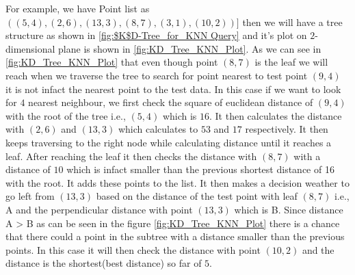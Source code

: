 \begin{mscexample}
	For example, we have Point list as $((5,4),(2,6),(13,3),(8,7),(3,1),(10,2))]$ then we will have a tree structure as shown in \ref{fig:$K$D-Tree_for_KNN Query} and it's plot on $2$-dimensional plane is shown in \ref{fig:KD_Tree_KNN_Plot}. As we can see in \ref{fig:KD_Tree_KNN_Plot} that even though point $(8,7)$ is the leaf we will reach when we traverse the tree to search for point nearest to test point $(9,4)$ it is not infact the nearest point to the test data. In this case if we want to look for $4$ nearest neighbour, we first check the square of euclidean distance of $(9,4)$ with the root of the tree i.e., $(5,4)$ which is $16$. It then calculates the distance with $(2,6)$ and $(13,3)$ which calculates to $53$ and $17$ respectively. It then keeps traversing to the right node while calculating distance until it reaches a leaf. After reaching the leaf it then checks the distance with $(8,7)$ with a distance of $10$ which is infact smaller than the previous shortest distance of 16 with the root. It adds these points to the list. It then makes a decision weather to go left from $(13,3)$ based on the distance of the test point with leaf $(8,7)$ i.e., A and the perpendicular distance with point $(13,3)$ which is B. Since distance A > B as can be seen in the figure \ref{fig:KD_Tree_KNN_Plot} there is a chance that there could a point in the subtree with a distance smaller than the previous points. In this case it will then check the distance with point $(10,2)$ and the distance is the shortest(best distance) so far of $5$. 
\end{mscexample}

